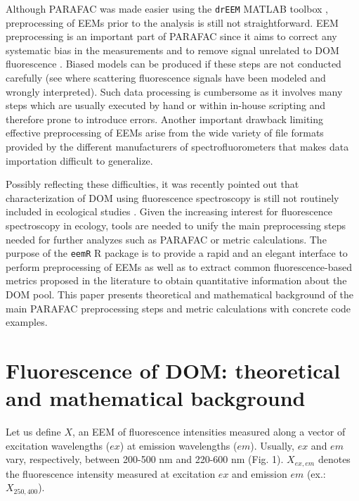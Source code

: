 \documentclass[]{book}
\begin{document}
Although PARAFAC was made easier using the \texttt{drEEM} MATLAB toolbox
\citep{Murphy2013}, preprocessing of EEMs prior to the analysis is still
not straightforward. EEM preprocessing is an important part of PARAFAC
since it aims to correct any systematic bias in the measurements and to
remove signal unrelated to DOM fluorescence \citep{Murphy2013}. Biased
models can be produced if these steps are not conducted carefully (see
\citet{Hiriart-Baer2008} where scattering fluorescence signals have been
modeled and wrongly interpreted). Such data processing is cumbersome as
it involves many steps \citep{Stedmon2008, Murphy2013} which are usually
executed by hand or within in-house scripting and therefore prone to
introduce errors. Another important drawback limiting effective
preprocessing of EEMs arise from the wide variety of file formats
provided by the different manufacturers of spectrofluorometers that
makes data importation difficult to generalize.

Possibly reflecting these difficulties, it was recently pointed out that
characterization of DOM using fluorescence spectroscopy is still not
routinely included in ecological studies \citep{Fellman2010}. Given the
increasing interest for fluorescence spectroscopy in ecology, tools are
needed to unify the main preprocessing steps needed for further analyzes
such as PARAFAC or metric calculations. The purpose of the \texttt{eemR}
R package is to provide a rapid and an elegant interface to perform
preprocessing of EEMs as well as to extract common fluorescence-based
metrics proposed in the literature to obtain quantitative information
about the DOM pool. This paper presents theoretical and mathematical
background of the main PARAFAC preprocessing steps and metric
calculations with concrete code examples.

\section{Fluorescence of DOM: theoretical and mathematical
background}\label{fluorescence-of-dom-theoretical-and-mathematical-background}

Let us define \(X\), an EEM of fluorescence intensities measured along a
vector of excitation wavelengths (\(ex\)) at emission wavelengths
(\(em\)). Usually, \(ex\) and \(em\) vary, respectively, between 200-500
nm and 220-600 nm (Fig. 1). \(X_{ex, em}\) denotes the fluorescence
intensity measured at excitation \(ex\) and emission \(em\) (ex.:
\(X_{250, 400}\)).
\end{document}
